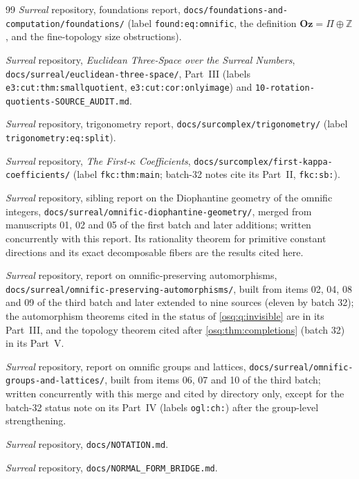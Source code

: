 \documentclass[11pt,letterpaper]{article}
\numberwithin{equation}{section}
\theoremstyle{definition}
\theoremstyle{remark}
\theoremstyle{plain}
\newcommand{\Oz}{\mathbf{Oz}}
\newcommand{\Z}{\mathbb Z}
\begin{document}
\begin{thebibliography}{99}
\emph{Surreal} repository, foundations report,
\texttt{docs/foundations-and-computation/foundations/} (label \nolinkurl{found:eq:omnific}, the
definition $\Oz=\Pi\oplus\Z$, and the fine-topology size obstructions).

\emph{Surreal} repository, \emph{Euclidean Three-Space over the Surreal Numbers},
\texttt{docs/surreal/euclidean-three-space/}, Part~III (labels \nolinkurl{e3:cut:thm:smallquotient},
\nolinkurl{e3:cut:cor:onlyimage}) and \texttt{10-rotation-quotients-SOURCE\_AUDIT.md}.

\emph{Surreal} repository, trigonometry report, \texttt{docs/surcomplex/trigonometry/}
(label \nolinkurl{trigonometry:eq:split}).

\emph{Surreal} repository, \emph{The First-$\kappa$ Coefficients},
\texttt{docs/surcomplex/first-kappa-coefficients/} (label \nolinkurl{fkc:thm:main}; batch-32 notes cite its Part~II,
\nolinkurl{fkc:sb:}).

\emph{Surreal} repository, sibling report on the Diophantine geometry of the omnific integers,
\texttt{docs/surreal/omnific-diophantine-geometry/}, merged from manuscripts 01, 02 and 05 of the
first batch and later additions; written concurrently with this report. Its rationality theorem for
primitive constant directions and its exact decomposable fibers are the results cited here.

\emph{Surreal} repository, report on omnific-preserving automorphisms,
\texttt{docs/surreal/omnific-preserving-automorphisms/}, built from items 02, 04, 08 and 09 of the third batch and later
extended to nine sources (eleven by batch 32); the automorphism theorems cited in the status of \cref{osq:q:invisible} are in its
Part~III, and the topology theorem cited after \cref{osq:thm:completions} (batch 32) in its Part~V.

\emph{Surreal} repository, report on omnific groups and lattices, \texttt{docs/surreal/omnific-groups-and-lattices/}, built from
items 06, 07 and 10 of the third batch; written concurrently with this merge and cited by directory only, except
for the batch-32 status note on its Part~IV (labels \nolinkurl{ogl:ch:}) after the group-level strengthening.

\emph{Surreal} repository, \texttt{docs/NOTATION.md}.

\emph{Surreal} repository, \texttt{docs/NORMAL\_FORM\_BRIDGE.md}.


\end{thebibliography}
\end{document}
